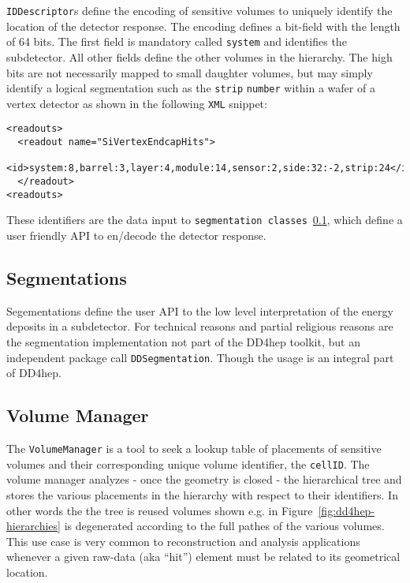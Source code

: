 \texttt{IDDescriptor}s define the encoding of sensitive volumes to uniquely identify the location of the detector response. The encoding defines a bit-field with the length of 64 bits. The first field is mandatory called \texttt{system} and identifies the subdetector. All other fields define the other volumes in the hierarchy. The high bits are not necessarily mapped to small daughter volumes, but may simply identify a logical segmentation such as the \texttt{strip} \texttt{number} within a wafer of a vertex detector as shown in the following \texttt{XML} snippet: 
\begin{verbatim}
<readouts>
  <readout name="SiVertexEndcapHits">
    <id>system:8,barrel:3,layer:4,module:14,sensor:2,side:32:-2,strip:24</id>
  </readout>
<readouts>
\end{verbatim}
These identifiers are the data input to  \texttt{segmentation classes}~\ref{sec:dd4hep-manual-readout-segmentations}, which define a user friendly API to en/decode the detector response.

\subsection{Segmentations}
\label{sec:dd4hep-manual-readout-segmentations}

Segementations define the user API to the low level interpretation of the energy deposits in a subdetector. For technical reasons and partial religious reasons are the segmentation implementation not part of the DD4hep  toolkit, but an independent package call \texttt{DDSegmentation}. Though the usage is an integral part of DD4hep.

\subsection{Volume Manager}
The \texttt{VolumeManager} is a tool to seek a lookup table of placements of  sensitive volumes and their corresponding unique volume identifier, the \texttt{cellID}. The volume manager analyzes - once the geometry is closed - the hierarchical tree and stores the various placements in the hierarchy with respect to their identifiers. In other words the the tree is  reused volumes shown e.g. in Figure~\ref{fig:dd4hep-hierarchies} is degenerated  according to the full pathes of the various volumes. This  use case is very common to reconstruction and analysis applications whenever a given raw-data (aka ``hit'') element must be related to its geometrical location.

